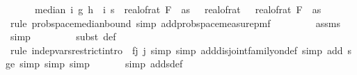 \begin{isabellebody}
\ \ \ \ \ \ {\isasymbar}median\ {\isacharparenleft}{\kern0pt}{\isasymlambda}i{\isachardot}{\kern0pt}\ g{\isacharprime}{\kern0pt}\ {\isacharparenleft}{\kern0pt}h\ {\isacharparenleft}{\kern0pt}{\isasymomega}\ i{\isacharparenright}{\kern0pt}{\isacharparenright}{\kern0pt}{\isacharparenright}{\kern0pt}\ s\ {\isacharminus}{\kern0pt}\ real{\isacharunderscore}{\kern0pt}of{\isacharunderscore}{\kern0pt}rat\ {\isacharparenleft}{\kern0pt}F\ {}\ as{\isacharparenright}{\kern0pt}{\isasymbar}\ {\isasymle}\ \ real{\isacharunderscore}{\kern0pt}of{\isacharunderscore}{\kern0pt}rat\ {\isasymdelta}\ {\isacharasterisk}{\kern0pt}\ real{\isacharunderscore}{\kern0pt}of{\isacharunderscore}{\kern0pt}rat\ {\isacharparenleft}{\kern0pt}F\ {}\ as{\isacharparenright}{\kern0pt}{\isacharparenright}{\kern0pt}{\isachardoublequoteclose}\isanewline
\ \ \ \ \isamarkupfalse%
\ {\isacharparenleft}{\kern0pt}rule\ prob{\isacharunderscore}{\kern0pt}space{\isachardot}{\kern0pt}median{\isacharunderscore}{\kern0pt}bound{\isacharunderscore}{\kern0pt}{}{\isacharcomma}{\kern0pt}\ simp\ add{\isacharcolon}{\kern0pt}prob{\isacharunderscore}{\kern0pt}space{\isacharunderscore}{\kern0pt}measure{\isacharunderscore}{\kern0pt}pmf{\isacharparenright}{\kern0pt}\isanewline
\ \ \ \ \ \ \ \isamarkupfalse%
\ assms\ \isamarkupfalse%
\ simp\ \isanewline
\ \ \ \ \ \ \isamarkupfalse%
\ {\isacharparenleft}{\kern0pt}subst\ {\isasymOmega}def{\isacharparenright}{\kern0pt}\isanewline
\ \ \ \ \ \ \isamarkupfalse%
\ {\isacharparenleft}{\kern0pt}rule\ indep{\isacharunderscore}{\kern0pt}vars{\isacharunderscore}{\kern0pt}restrict{\isacharunderscore}{\kern0pt}intro\ {\isacharbrackleft}{\kern0pt}\ f{\isacharequal}{\kern0pt}{\isachardoublequoteopen}{\isasymlambda}j{\isachardot}{\kern0pt}\ {\isacharbraceleft}{\kern0pt}j{\isacharbraceright}{\kern0pt}{\isachardoublequoteclose}{\isacharbrackright}{\kern0pt}{\isacharcomma}{\kern0pt}\ simp{\isacharcomma}{\kern0pt}\ simp\ add{\isacharcolon}{\kern0pt}disjoint{\isacharunderscore}{\kern0pt}family{\isacharunderscore}{\kern0pt}on{\isacharunderscore}{\kern0pt}def{\isacharcomma}{\kern0pt}\ simp\ add{\isacharcolon}{\kern0pt}\ s{\isacharunderscore}{\kern0pt}ge{\isacharunderscore}{\kern0pt}{}{\isacharcomma}{\kern0pt}\ simp{\isacharcomma}{\kern0pt}\ simp{\isacharcomma}{\kern0pt}\ simp{\isacharparenright}{\kern0pt}\isanewline
\ \ \ \ \ \isamarkupfalse%
\ {\isacharparenleft}{\kern0pt}simp\ add{\isacharcolon}{\kern0pt}s{\isacharunderscore}{\kern0pt}def{\isacharparenright}{\kern0pt}\ \isamarkupfalse%

\end{isabellebody}
